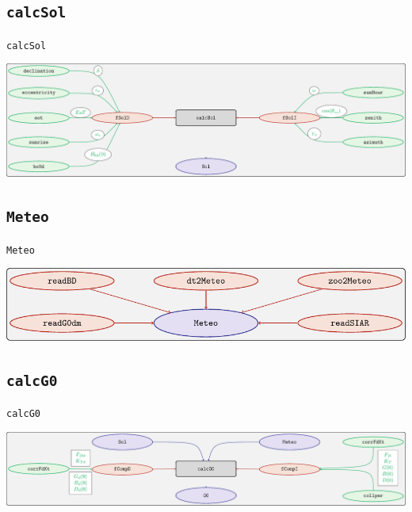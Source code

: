 \documentclass[aspectratio=169, usenames,svgnames,dvipsnames]{beamer}
\begin{document}
\subsection{\texttt{calcSol}}
\label{sec:org2a87aa4}
\begin{frame}[label={sec:orgbb5ac34},fragile]{\texttt{calcSol}}
 \begin{center}
\includegraphics[width=\textwidth]{../figuras/calcsol.pdf}
\end{center}
\end{frame}
\subsection{\texttt{Meteo}}
\label{sec:orgb8fce20}
\begin{frame}[label={sec:org74fb24a},fragile]{\texttt{Meteo}}
 \begin{center}
\includegraphics[width=\textwidth]{../figuras/meteo.pdf}
\end{center}
\end{frame}
\subsection{\texttt{calcG0}}
\label{sec:orgff16d78}
\begin{frame}[label={sec:org527fe49},fragile]{\texttt{calcG0}}
 \begin{center}
\includegraphics[width=\textwidth]{../figuras/calcg0.pdf}
\end{center}
\end{frame}
\end{document}
